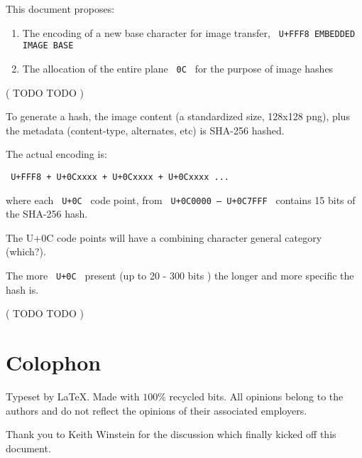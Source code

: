 \documentclass[12pt]{article}
\begin{document}
This document proposes:

\begin{enumerate}

\item The encoding of a new base character for image transfer, 
  \texttt{ U+FFF8 EMBEDDED IMAGE BASE }
  
\item The allocation of the entire plane \texttt{ 0C } for the purpose of image hashes

\end{enumerate}

( TODO TODO )

To generate a hash, the image content (a standardized size, 128x128 png),
plus the metadata (content-type, alternates, etc) is SHA-256 hashed.

The actual encoding is:


\texttt { U+FFF8 + U+0Cxxxx + U+0Cxxxx + U+0Cxxxx ... }


where each \texttt{ U+0C } code point, from \texttt { U+0C0000 — U+0C7FFF } contains
15 bits of the SHA-256 hash.

The U+0C code points will have a combining character general category (which?).  

The more  \texttt{ U+0C }  present (up to 20 - 300 bits ) the longer and more specific the hash is.

( TODO TODO )



\clearpage
{}
\printbibliography
\section*{Colophon}

Typeset by \LaTeX . Made with \( 100\%  \) recycled bits.
All opinions belong to the authors and do not reflect the opinions
of their associated employers.

Thank you to Keith Winstein for the discussion which finally kicked off this document.
\end{document}
